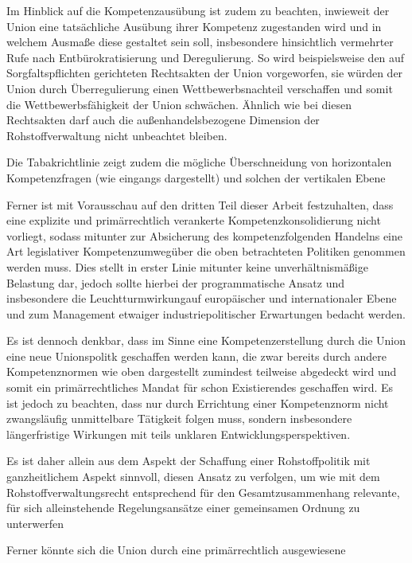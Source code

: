 \documentclass[12pt,a4paper,oneside]{book} %
\begin{document}
	Im Hinblick auf die Kompetenzausübung ist zudem zu beachten, inwieweit der Union eine tatsächliche Ausübung ihrer Kompetenz zugestanden wird und in welchem Ausmaße diese gestaltet sein soll, insbesondere hinsichtlich vermehrter Rufe nach Entbürokratisierung und Deregulierung. So wird beispielsweise den auf Sorgfaltspflichten gerichteten Rechtsakten der Union vorgeworfen, sie würden der Union durch Überregulierung einen Wettbewerbsnachteil verschaffen und somit die Wettbewerbsfähigkeit der Union schwächen.\autocite{EuZW 2025, 685} Ähnlich wie bei diesen Rechtsakten darf auch die außenhandelsbezogene Dimension der Rohstoffverwaltung nicht unbeachtet bleiben.
	
	Die Tabakrichtlinie zeigt zudem die mögliche Überschneidung von horizontalen Kompetenzfragen (wie eingangs dargestellt) und solchen der vertikalen Ebene
	
	Ferner ist mit Vorausschau auf den dritten Teil dieser Arbeit festzuhalten, dass eine explizite und primärrechtlich verankerte Kompetenzkonsolidierung nicht vorliegt, sodass mitunter zur Absicherung des kompetenzfolgenden Handelns eine Art legislativer \glqq Kompetenzumweg\grqq über die oben betrachteten Politiken genommen werden muss. Dies stellt in erster Linie mitunter keine unverhältnismäßige Belastung dar, jedoch sollte hierbei der programmatische Ansatz und insbesondere die \glqq Leuchtturmwirkung\grqq auf europäischer und internationaler Ebene und zum Management etwaiger industriepolitischer Erwartungen bedacht werden.
	
	Es ist dennoch denkbar, dass im Sinne eine Kompetenzerstellung durch die Union eine neue Unionspolitk geschaffen werden kann, die zwar bereits durch andere Kompetenznormen wie oben dargestellt zumindest teilweise abgedeckt wird und somit ein primärrechtliches Mandat für schon Existierendes geschaffen wird. Es ist jedoch zu beachten, dass nur durch Errichtung einer Kompetenznorm nicht zwangsläufig unmittelbare Tätigkeit folgen muss, sondern insbesondere längerfristige Wirkungen mit teils unklaren Entwicklungsperspektiven.\autocite[siehe hierzu Nettesheim Art. 194 En 40]{grabitz_recht_2024}
	
	Es ist daher allein aus dem Aspekt der Schaffung einer Rohstoffpolitik mit ganzheitlichem Aspekt sinnvoll, diesen Ansatz zu verfolgen, um wie mit dem Rohstoffverwaltungsrecht entsprechend für den Gesamtzusammenhang relevante, für sich alleinstehende Regelungsansätze einer gemeinsamen Ordnung zu unterwerfen
	
	Ferner könnte sich die Union durch eine primärrechtlich ausgewiesene
	
\end{document}
